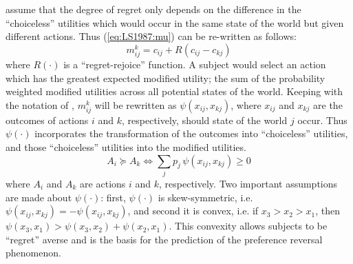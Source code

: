 \documentclass[../main.tex]{subfiles}
\begin{document}
\textcite[809]{Loomes1987} assume that the degree of regret only depends on the difference in the \enquote{choiceless} utilities which would occur in the same state of the world but given different actions.
Thus (\ref{eq:LS1987:mu}) can be re-written as follows:
\begin{equation}
	\label{eq:LS1987:mu2}
	m^k_{ij} = c_{ij} + R(c_{ij} - c_{kj})
\end{equation}
\noindent where $R(\cdot)$ is a \enquote{regret-rejoice} function. 
A subject would select an action which has the greatest expected modified utility; the sum of the probability weighted modified utilities across all potential states of the world.
Keeping with the notation of \textcite{Loomes1989}, $m^k_{ij}$ will be rewritten as $\psi(x_{ij}, x_{kj})$, where $x_{ij}$ and $x_{kj}$ are the outcomes of actions $i$ and $k$, respectively, should state of the world $j$ occur.
Thus $\psi(\cdot)$ incorporates the transformation of the outcomes into \enquote{choiceless} utilities, and those \enquote{choiceless} utilities into the modified utilities.
\begin{equation}
	\label{eq:LSS1989:mu3}
	A_i \succcurlyeq  A_k \Leftrightarrow \sum_{j} p_j \, \psi ( x_{ij} , x_{kj} ) \geq  0
\end{equation}
\noindent where $A_i$ and $A_k$ are actions $i$ and $k$, respectively.
Two important assumptions are made about $\psi(\cdot)$: first, $\psi(\cdot)$ is skew-symmetric, i.e. $\psi(x_{ij},x_{kj}) = -\psi(x_{ij},x_{kj})$, and second it is convex, i.e. if $x_3 > x_2 > x_1$, then $\psi(x_3,x_1) > \psi(x_3,x_2) + \psi(x_2,x_1)$.
This convexity allows subjects to be \enquote{regret} averse and is the basis for the prediction of the preference reversal phenomenon.
\end{document}
